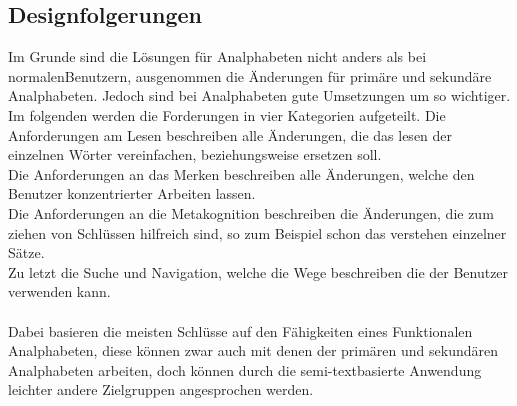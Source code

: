 \subsection{ Designfolgerungen }
Im Grunde sind die Lösungen für Analphabeten nicht anders als bei \glqq normalen\grqq Benutzern, ausgenommen die Änderungen für primäre und sekundäre Analphabeten. Jedoch sind bei Analphabeten gute Umsetzungen um so wichtiger.\\
Im folgenden werden die Forderungen in vier Kategorien aufgeteilt. 
Die Anforderungen am Lesen beschreiben alle Änderungen, die das lesen der einzelnen Wörter vereinfachen, beziehungsweise ersetzen soll.\\
Die Anforderungen an das Merken beschreiben alle Änderungen, welche den Benutzer konzentrierter Arbeiten lassen.\\
Die Anforderungen an die Metakognition beschreiben die Änderungen, die zum ziehen von Schlüssen hilfreich sind, so zum Beispiel schon das verstehen einzelner Sätze.\\
Zu letzt die Suche und Navigation, welche die Wege beschreiben die der Benutzer verwenden kann.\\\\
Dabei basieren die meisten Schlüsse auf den Fähigkeiten eines Funktionalen Analphabeten, diese können zwar auch mit denen der primären und sekundären Analphabeten arbeiten, doch können durch die semi-textbasierte Anwendung leichter andere Zielgruppen angesprochen werden.

